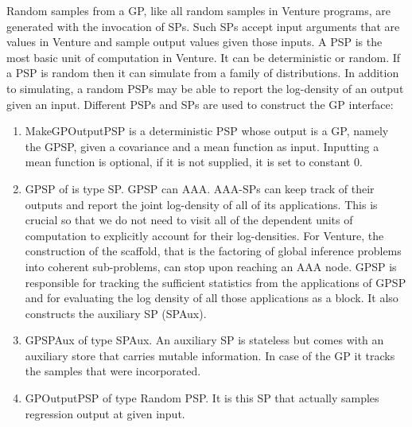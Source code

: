 Random samples from a \ac{GP}, like all random samples in Venture programs,
are generated with the invocation of \ac{SP}s.
Such \ac{SP}s accept input arguments that are values in Venture and sample output
values given those inputs. A \ac{PSP} is the most basic unit of computation in
Venture. It can be deterministic or random. If a \ac{PSP} is random then it can simulate from a family of
distributions. In addition to simulating,
a random PSPs may be able to report the log-density of an output given an input.
Different \ac{PSP}s and \ac{SP}s are used to construct the \ac{GP} interface:
\begin{enumerate}
\item MakeGPOutputPSP is a deterministic PSP whose output is a \ac{GP}, namely the
GPSP, given a
covariance and a mean function as input. Inputting a mean function is optional,
if it is not supplied, it is set to constant 0.

\item GPSP of is type SP. GPSP can \ac{AAA}. \ac{AAA}-\ac{SP}s can keep track of
their outputs and report
the joint log-density of all of its applications. This is crucial so that we do
not need to visit all of the dependent units of computation to explicitly account for their
log-densities. For Venture, the construction of the scaffold, that is the
factoring of global inference problems into coherent sub-problems, can stop upon
reaching an \ac{AAA} node. GPSP is responsible for tracking the sufficient statistics
from the applications of GPSP and for evaluating the log density of all those
applications as a block. It also constructs the auxiliary SP (SPAux).
\item GPSPAux of type SPAux. An auxiliary SP is stateless but comes with an auxiliary
store that carries mutable information. In case of the \ac{GP} it tracks the
samples that were incorporated.
\item GPOutputPSP of type Random PSP.  It is this SP that actually samples
regression output at given input.
\end{enumerate}





